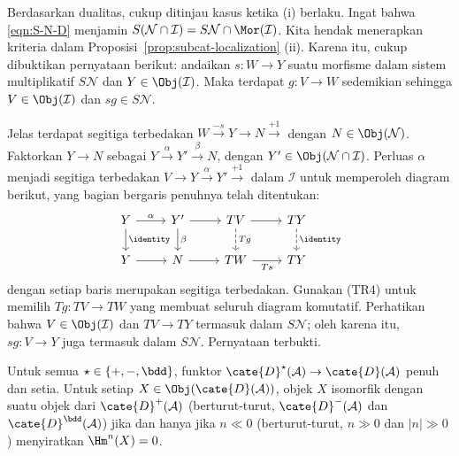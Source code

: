 \begin{bukti}
	Berdasarkan dualitas, cukup ditinjau kasus ketika (i) berlaku. Ingat bahwa
	\eqref{eqn:S-N-D} menjamin
	$S(\mathcal{N} \cap \mathcal{I}) = S\mathcal{N} \cap \Mor(\mathcal{I})$.
	Kita hendak menerapkan kriteria dalam
	Proposisi~\ref{prop:subcat-localization} (ii). Karena itu, cukup dibuktikan
	pernyataan berikut: andaikan $s: W \to Y$ suatu morfisme
	dalam sistem multiplikatif $S\mathcal{N}$ dan
	$Y \in \Obj(\mathcal{I})$. Maka terdapat $g: V \to W$ sedemikian sehingga
	$V \in \Obj(\mathcal{I})$ dan $sg \in S\mathcal{N}$.

	Jelas terdapat segitiga terbedakan
	$W \xrightarrow{-s} Y \to N \xrightarrow{+1}$ dengan
	$N \in \Obj(\mathcal{N})$. Faktorkan $Y \to N$ sebagai
	$Y \xrightarrow{\alpha} Y' \xrightarrow{\beta} N$, dengan
	$Y' \in \Obj(\mathcal{N} \cap \mathcal{I})$. Perluas $\alpha$ menjadi
	segitiga terbedakan $V \to Y \xrightarrow{\alpha} Y' \xrightarrow{+1}$
	dalam $\mathcal{I}$ untuk memperoleh diagram berikut, yang bagian bergaris
	penuhnya telah ditentukan:
	\[\begin{tikzcd}
		Y \arrow[r, "\alpha"] \arrow[d, "\identity"] & Y' \arrow[d, "\beta"] \arrow[r] & TV \arrow[r] \arrow[dashed, d, "Tg"] & TY \arrow[d, dashed, "\identity"] \\
		Y \arrow[r] & N \arrow[r] & TW \arrow[r, "Ts"'] & TY 
	\end{tikzcd}\]
	dengan setiap baris merupakan segitiga terbedakan. Gunakan (TR4) untuk
	memilih $Tg: TV \to TW$ yang membuat seluruh diagram komutatif. Perhatikan
	bahwa $V \in \Obj(\mathcal{I})$ dan $TV \to TY$ termasuk dalam
	$S\mathcal{N}$; oleh karena itu, $sg: V \to Y$ juga termasuk dalam
	$S\mathcal{N}$. Pernyataan terbukti.
\end{bukti}

\begin{proposisi}\label{prop:derived-full-faithful-subcat}
	Untuk semua $\star \in \{+, -, \bdd\}$, funktor
	$\cate{D}^{\star}(\mathcal{A}) \to \cate{D}(\mathcal{A})$ penuh dan setia.
	Untuk setiap $X \in \Obj(\cate{D}(\mathcal{A}))$, objek $X$ isomorfik dengan
	suatu objek dari $\cate{D}^{+}(\mathcal{A})$ (berturut-turut,
	$\cate{D}^{-}(\mathcal{A})$ dan $\cate{D}^{\bdd}(\mathcal{A})$) jika dan
	hanya jika $n \ll 0$ (berturut-turut, $n \gg 0$ dan $|n| \gg 0$)
	menyiratkan $\Hm^n(X) = 0$.
\end{proposisi}


